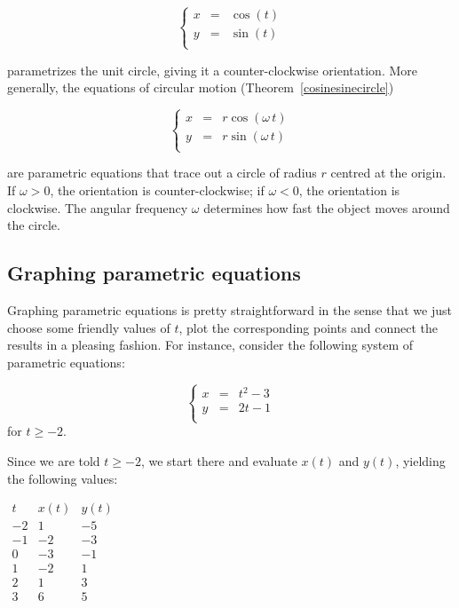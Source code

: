 	\[ \left\{\begin{array}{rcl} x & = & \cos(t)\\[0.2cm] y & = & \sin(t)\\ \end{array}\right. \] 
	
	parametrizes the unit circle, giving it a counter-clockwise orientation.  More generally, the equations of circular motion (Theorem~\ref{cosinesinecircle}) 
		
	\[\left\{ \begin{array}{rcl} x & = & r\cos(\omega\,t)\\[0.2cm]
	y & = & r\sin(\omega\,t)\\ \end{array}\right. \] 
			
are parametric equations that trace out a circle of radius $r$ centred at the origin.  If $\omega > 0$, the orientation is counter-clockwise;  if $\omega < 0$, the orientation is clockwise.  The angular frequency $\omega$ determines how fast the object moves around the circle. 

\subsection{Graphing parametric equations}
Graphing parametric equations is pretty straightforward in the sense that we just choose some friendly values of $t$,  plot the corresponding points and connect the results in a pleasing fashion. For instance, consider the following system of parametric equations:

\begin{equation}
\displaystyle \left\{\begin{array}{rcl} x & =  & t^2 - 3 \\[0.2cm] y & = & 2t-1 \\ \end{array}\right.
\label{exparametric}
\end{equation}
for $t \geq -2$. 

Since we are told $t \geq -2$, we start there and evaluate $x(t)$ and $y(t)$, yielding the following values: 

\begin{center}
\renewcommand{\arraystretch}{1.5}
$\begin{array}{r|cc}  

 t & x(t) & y(t) \\ \hline\hline
-2  & 1 & -5  \\  
-1  & -2 &  -3  \\  
0 & -3 & -1  \\  
1  & -2 & 1  \\  
2 & 1 & 3  \\  
3  & 6 & 5 \\  
\end{array} $ 

\renewcommand{\arraystretch}{1}
\end{center}

